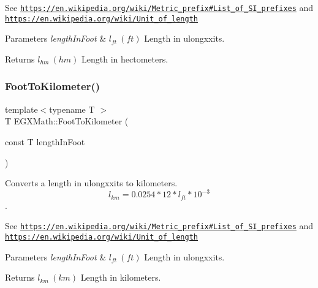 See \href{https://en.wikipedia.org/wiki/Metric_prefix#List_of_SI_prefixes}{\tt https\+://en.\+wikipedia.\+org/wiki/\+Metric\+\_\+prefix\#\+List\+\_\+of\+\_\+\+S\+I\+\_\+prefixes} and \href{https://en.wikipedia.org/wiki/Unit_of_length}{\tt https\+://en.\+wikipedia.\+org/wiki/\+Unit\+\_\+of\+\_\+length} 
\begin{DoxyParams}{Parameters}
{\em length\+In\+Foot} & $ l_{ft}\ (ft)$ Length in ulongxxits. \\
\hline
\end{DoxyParams}
\begin{DoxyReturn}{Returns}
$ l_{hm}\ (hm)$ Length in hectometers. 
\end{DoxyReturn}
\mbox{\label{group___e_g_x_math-_conversions-_length_conversions-_imperial-_foot-_s_i_ga7ba5eab58921ef00677d0b7db78d4daf}} 
\subsubsection{\texorpdfstring{Foot\+To\+Kilometer()}{FootToKilometer()}}
{\footnotesize\ttfamily template$<$typename T $>$ \\
T E\+G\+X\+Math\+::\+Foot\+To\+Kilometer (\begin{DoxyParamCaption}\item[{const T}]{length\+In\+Foot }\end{DoxyParamCaption})}



Converts a length in ulongxxits to kilometers. \[ l_{km}=0.0254 * 12 * l_{ft} * 10^{-3} \]. 

See \href{https://en.wikipedia.org/wiki/Metric_prefix#List_of_SI_prefixes}{\tt https\+://en.\+wikipedia.\+org/wiki/\+Metric\+\_\+prefix\#\+List\+\_\+of\+\_\+\+S\+I\+\_\+prefixes} and \href{https://en.wikipedia.org/wiki/Unit_of_length}{\tt https\+://en.\+wikipedia.\+org/wiki/\+Unit\+\_\+of\+\_\+length} 
\begin{DoxyParams}{Parameters}
{\em length\+In\+Foot} & $ l_{ft}\ (ft)$ Length in ulongxxits. \\
\hline
\end{DoxyParams}
\begin{DoxyReturn}{Returns}
$ l_{km}\ (km)$ Length in kilometers. 
\end{DoxyReturn}
\mbox{\label{group___e_g_x_math-_conversions-_length_conversions-_imperial-_foot-_s_i_ga6c4a1e4268e872deaa6e8167c69b0038}} 
